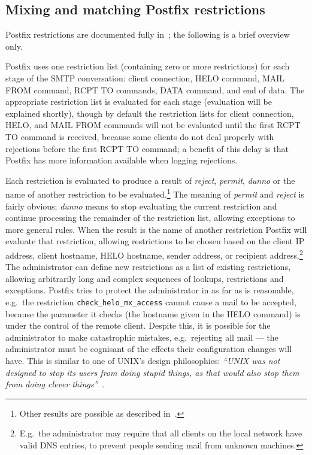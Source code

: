 \subsection{Mixing and matching Postfix restrictions}

\label{Mixing and matching Postfix restrictions}

Postfix restrictions are documented fully in~\cite{smtpd_access_readme,
smtpd_per_user_control, policy-servers}; the following is a brief overview
only.

Postfix uses one restriction list (containing zero or more restrictions)
for each stage of the \gls{SMTP} conversation: client connection, HELO
command, MAIL FROM command, RCPT TO commands, DATA command, and end of
data.  The appropriate restriction list is evaluated for each stage
(evaluation will be explained shortly), though by default the restriction
lists for client connection, HELO, and MAIL FROM commands will not be
evaluated until the first RCPT TO command is received, because some clients
do not deal properly with rejections before the first RCPT TO command; a
benefit of this delay is that Postfix has more information available when
logging rejections.

Each restriction is evaluated to produce a result of \textit{reject},
\textit{permit}, \textit{dunno\/} or the name of another restriction to be
evaluated.\footnote{Other results are possible as described
in~\cite{smtpd_access_readme,smtpd_per_user_control,policy-servers}.} The
meaning of \textit{permit\/} and \textit{reject\/} is fairly obvious;
\textit{dunno\/} means to stop evaluating the current restriction and
continue processing the remainder of the restriction list, allowing
exceptions to more general rules.  When the result is the name of another
restriction Postfix will evaluate that restriction, allowing restrictions
to be chosen based on the client \gls{IP} address, client hostname, HELO
hostname, sender address, or recipient address.\footnote{E.g.\ the
administrator may require that all clients on the local network have valid
DNS entries, to prevent people sending mail from unknown machines.}  The
administrator can define new restrictions as a list of existing
restrictions, allowing arbitrarily long and complex sequences of lookups,
restrictions and exceptions.  Postfix tries to protect the administrator in
as far as is reasonable, e.g.\ the restriction
\texttt{check\_helo\_mx\_access} cannot cause a mail to be accepted,
because the parameter it checks (the hostname given in the HELO command) is
under the control of the remote client.  Despite this, it is possible for
the administrator to make catastrophic mistakes, e.g.\ rejecting all mail
--- the administrator must be cognisant of the effects their configuration
changes will have.  This is similar to one of UNIX's design philosophies:
\textit{``UNIX was not designed to stop its users from doing stupid things,
as that would also stop them from doing clever
things''\/}~\cite{unix-philosophy}.

